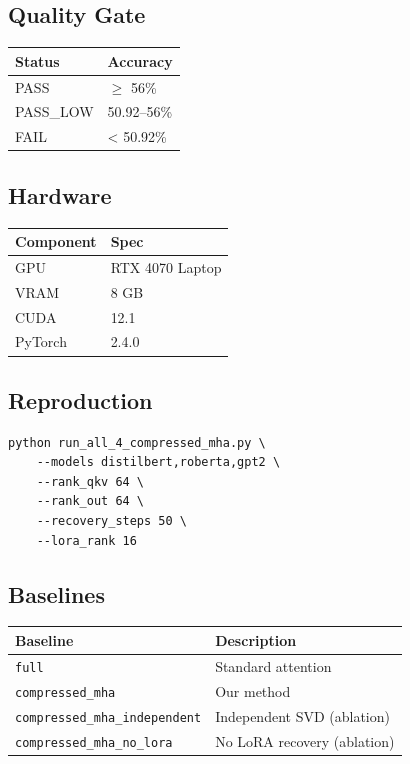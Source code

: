 \subsection{Quality Gate}

\begin{table}[H]
\centering
\small
\begin{tabular}{ll}
\toprule
\textbf{Status} & \textbf{Accuracy} \\
\midrule
PASS & $\ge$ 56\% \\
PASS\_LOW & 50.92--56\% \\
FAIL & < 50.92\% \\
\bottomrule
\end{tabular}
\end{table}

\subsection{Hardware}

\begin{table}[H]
\centering
\small
\begin{tabular}{ll}
\toprule
\textbf{Component} & \textbf{Spec} \\
\midrule
GPU & RTX 4070 Laptop \\
VRAM & 8 GB \\
CUDA & 12.1 \\
PyTorch & 2.4.0 \\
\bottomrule
\end{tabular}
\end{table}

\subsection{Reproduction}

\begin{lstlisting}
python run_all_4_compressed_mha.py \
    --models distilbert,roberta,gpt2 \
    --rank_qkv 64 \
    --rank_out 64 \
    --recovery_steps 50 \
    --lora_rank 16
\end{lstlisting}

\subsection{Baselines}

\begin{table}[H]
\centering
\small
\begin{tabular}{ll}
\toprule
\textbf{Baseline} & \textbf{Description} \\
\midrule
\texttt{full} & Standard attention \\
\texttt{compressed\_mha} & Our method \\
\texttt{compressed\_mha\_independent} & Independent SVD (ablation) \\
\texttt{compressed\_mha\_no\_lora} & No LoRA recovery (ablation) \\
\bottomrule
\end{tabular}
\end{table}

